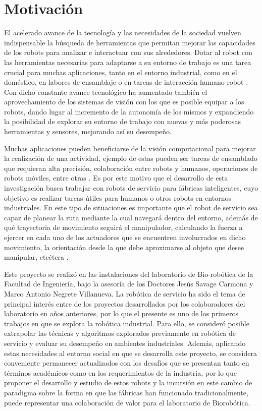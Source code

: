 \section{Motivación}
El acelerado avance de la tecnología y las necesidades de la sociedad vuelven indispensable la búsqueda de herramientas que permitan mejorar las capacidades de los robots para analizar e interactuar con sus alrededores. Dotar al robot con las herramientas necesarias para adaptarse a su entorno de trabajo es una tarea crucial para muchas aplicaciones, tanto en el entorno industrial, como en el doméstico, en labores de ensamblaje o en tareas de interacción humano-robot \cite{roveda_robot_2022}. Con dicho constante avance tecnológico ha aumentado también el aprovechamiento de los sistemas de visión con los que es posible  equipar a los robots, dando lugar al incremento de la autonomía de los mismos y expandiendo la posibilidad de explorar su entorno de trabajo con nuevas y más poderosas herramientas y sensores, mejorando así su desempeño.


Muchas aplicaciones pueden beneficiarse de la visión computacional para mejorar la realización de una actividad, ejemplo de estas pueden ser tareas de ensamblado que requieran alta precisión, colaboración entre robots y humanos, operaciones de robots móviles, entre otras \cite{ROVEDA2021103711}. Es por este motivo que el desarrollo de esta investigación busca trabajar con robots de servicio para fábricas inteligentes, cuyo objetivo es realizar tareas útiles para humanos o otros robots en entornos industriales. En este tipo de situaciones es importante que el robot de servicio sea capaz de planear la ruta mediante la cual navegará dentro del entorno, además de qué trayectoria de movimiento seguirá el manipulador, calculando la fuerza a ejercer en cada uno de los actuadores que se encuentren involucrados en dicho movimiento, la orientación desde la que debe aproximarse al objeto que desee manipular, etcétera \cite{Rosenbaum2006}.


Este proyecto se realizó en las instalaciones del laboratorio de Bio-robótica de la Facultad de Ingeniería, bajo la asesoría de los Doctores Jesús Savage Carmona y Marco Antonio Negrete Villanueva. La robótica de servicio ha sido el tema de principal interés entre de los proyectos desarrollados por los colaboradores del laboratorio en años anteriores, por lo que el presente es uno de los primeros trabajos en que se explora la robótica industrial. Para ello, se consideró posible extrapolar las técnicas y algoritmos explorados previamente en robótica de servicio y evaluar su desempeño en ambientes industriales. Además, aplicando estas necesidades al entorno social en que se desarrolla este proyecto, se considera conveniente permanecer actualizados con los desafíos que se presentan tanto en términos académicos como en los requerimientos de la industria, por lo que proponer el desarrollo y estudio de estos robots y la incursión en este cambio de paradigma sobre la forma en que las fábricas han funcionado tradicionalmente, puede representar una colaboración de valor para el laboratorio de Biorobótica.

